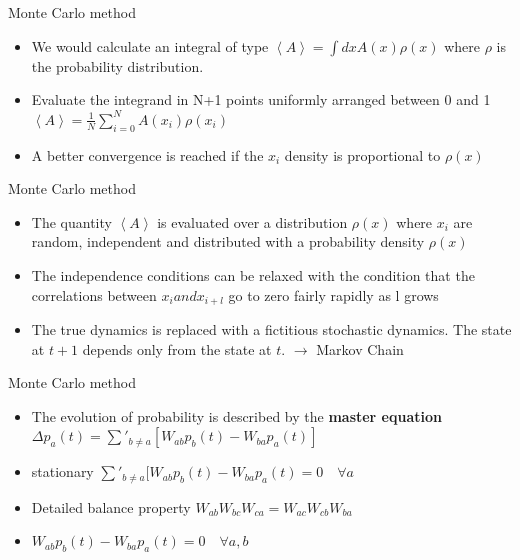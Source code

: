 \documentclass{beamer}
\begin{document}
\begin{frame}{Monte Carlo method \cite{peliti2011statistical}}


\begin{itemize}
\item We would calculate an integral of type $\left\langle  A\right\rangle = \int dxA(x)\rho(x)$ where $\rho$ is the probability distribution.



\item Evaluate the integrand in N+1 points uniformly arranged between 0 and 1  $\left\langle  A\right\rangle = \frac{1}{N}\sum_{i=0}^{N}A(x_{i})\rho(x_{i})$



\item A better convergence is reached if the $x_{i}$ density is proportional to $\rho(x)$


\end{itemize}
\end{frame}

\begin{frame}{Monte Carlo method \cite{peliti2011statistical}}

\begin{itemize}

\item The quantity $\left\langle  A\right\rangle $ is evaluated over a distribution $\rho(x)$ where $x_{i}$ are random,  independent and distributed with a probability density $\rho(x)$



\item The independence conditions can be relaxed with the condition that the correlations between $x_{i} and x_{i+l}$ go to zero fairly rapidly as l grows 


\item The true dynamics is replaced with a fictitious stochastic dynamics.  The state at $t+1$ depends only from the state at $t$.  $\rightarrow$ Markov Chain 

\end{itemize}

\end{frame}

\begin{frame}{Monte Carlo method \cite{peliti2011statistical}}

\begin{itemize}

\item The evolution of probability is described by the \textbf{master equation} $\Delta p_{a}(t)=\sum'_{b\neq a}[W_{ab}p_{b}(t)-W_{ba}p_{a}(t)]$


\item stationary  \rightarrow $ \sum'_{b\neq a}[W_{ab}p_{b}(t)-W_{ba}p_{a}(t)=0\quad \forall a$


\item Detailed balance property $W_{ab}W_{bc}W_{ca}=W_{ac}W_{cb}W_{ba}$


\item $ W_{ab}p_{b}(t)-W_{ba}p_{a}(t)=0\quad \forall a,b$
\end{itemize}

\end{frame}
\end{document}
